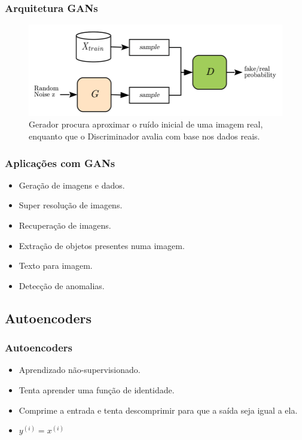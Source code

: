 \documentclass{beamer}
\begin{document}
\begin{frame}
\frametitle{Arquitetura GANs}
\begin{figure}
\includegraphics[width=1\linewidth]{images/gan}
\caption{Gerador procura aproximar o ruído inicial de uma imagem real, enquanto que o Discriminador avalia com base nos dados reais.}
\end{figure}
\end{frame}

\begin{frame}
\frametitle{Aplicações com GANs}
\begin{itemize}
\item Geração de imagens e dados.
\item Super resolução de imagens.
\item Recuperação de imagens.
\item Extração de objetos presentes numa imagem.
\item Texto para imagem.
\item Detecção de anomalias.
\end{itemize}
\end{frame}

\subsection{Autoencoders}

\begin{frame}
\frametitle{Autoencoders}
\begin{itemize}
\item Aprendizado não-supervisionado.
\item Tenta aprender uma função de identidade.
\item Comprime a entrada e tenta descomprimir para que a saída seja igual a ela.
\item $y^{(i)} = x^{(i)}$
\end{itemize}
\end{frame}
\end{document}
